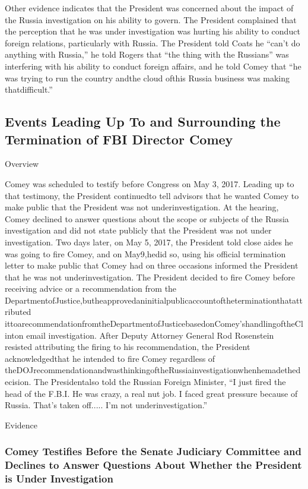 Other evidence indicates that the President was concerned about the impact of the Russia investigation on his ability to govern.
The President complained that the perception that he was under investigation was hurting his ability to conduct foreign relations, particularly with Russia.
The President told Coats he “can’t do anything with Russia,” he told Rogers that “the thing with the Russians” was interfering with his ability to conduct foreign affairs, and he told Comey that “he was trying to run the country andthe cloud ofthis Russia business was making thatdifficult.”

\subsection{Events Leading Up To and Surrounding the Termination of FBI Director Comey}

Overview

Comey was scheduled to testify before Congress on May 3, 2017.
Leading up to that testimony, the President continuedto tell advisors that he wanted Comey to make public that the President was not underinvestigation.
At the hearing, Comey declined to answer questions about the scope or subjects of the Russia investigation and did not state publicly that the President was not under investigation.
Two days later, on May 5, 2017, the President told close aides he was going to fire Comey, and on May9,hedid so, using his official termination letter to make public that Comey had on three occasions informed the President that he was not underinvestigation.
The President decided to fire Comey before receiving advice or a recommendation from the DepartmentofJustice,butheapprovedaninitialpublicaccountoftheterminationthatattributed ittoarecommendationfromtheDepartmentofJusticebasedonComey’shandlingoftheClinton email investigation.
After Deputy Attorney General Rod Rosenstein resisted attributing the firing to his recommendation, the President acknowledgedthat he intended to fire Comey regardless of theDOJrecommendationandwasthinkingoftheRussiainvestigationwhenhemadethedecision.
The Presidentalso told the Russian Foreign Minister, “I just fired the head of the F.B.I. He was crazy, a real nut job.
I faced great pressure because of Russia.
That’s taken off.....
I’m not underinvestigation.”

Evidence

\subsubsection{Comey Testifies Before the Senate Judiciary Committee and Declines to Answer Questions About Whether the President is Under Investigation}

